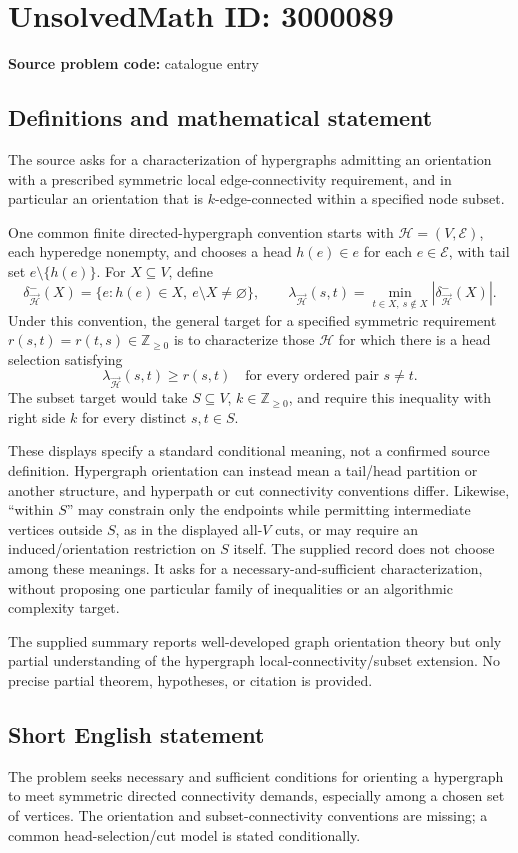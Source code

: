\documentclass[11pt]{article}
\newcommand{\Z}{\mathbb{Z}}
\begin{document}
\section*{UnsolvedMath ID: 3000089}
\textbf{Source problem code:} catalogue entry
\subsection{Definitions and mathematical statement}
The source asks for a characterization of hypergraphs admitting an orientation with a prescribed symmetric local edge-connectivity requirement, and in particular an orientation that is $k$-edge-connected within a specified node subset.

One common finite directed-hypergraph convention starts with $\mathcal H=(V,\mathcal E)$, each hyperedge nonempty, and chooses a head $h(e)\in e$ for each $e\in\mathcal E$, with tail set $e\setminus\{h(e)\}$. For $X\subseteq V$, define
\[
\delta^-_{\vec{\mathcal H}}(X)=
\{e:h(e)\in X,\ e\setminus X\ne\varnothing\},
\qquad
\lambda_{\vec{\mathcal H}}(s,t)=
\min_{t\in X,\ s\notin X}|\delta^-_{\vec{\mathcal H}}(X)|.
\]
Under this convention, the general target for a specified symmetric requirement $r(s,t)=r(t,s)\in\Z_{\geq0}$ is to characterize those $\mathcal H$ for which there is a head selection satisfying
\[
\lambda_{\vec{\mathcal H}}(s,t)\geq r(s,t)
\quad\text{for every ordered pair }s\ne t.
\]
The subset target would take $S\subseteq V$, $k\in\Z_{\geq0}$, and require this inequality with right side $k$ for every distinct $s,t\in S$.

These displays specify a standard conditional meaning, not a confirmed source definition. Hypergraph orientation can instead mean a tail/head partition or another structure, and hyperpath or cut connectivity conventions differ. Likewise, ``within $S$'' may constrain only the endpoints while permitting intermediate vertices outside $S$, as in the displayed all-$V$ cuts, or may require an induced/orientation restriction on $S$ itself. The supplied record does not choose among these meanings. It asks for a necessary-and-sufficient characterization, without proposing one particular family of inequalities or an algorithmic complexity target.

The supplied summary reports well-developed graph orientation theory but only partial understanding of the hypergraph local-connectivity/subset extension. No precise partial theorem, hypotheses, or citation is provided.
\subsection{Short English statement}
The problem seeks necessary and sufficient conditions for orienting a hypergraph to meet symmetric directed connectivity demands, especially among a chosen set of vertices. The orientation and subset-connectivity conventions are missing; a common head-selection/cut model is stated conditionally.
\end{document}
